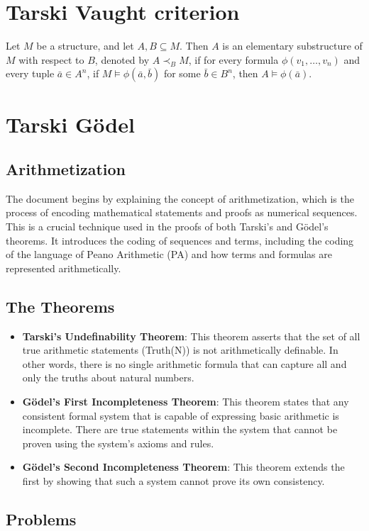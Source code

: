 \documentclass[10pt]{article}
\begin{document}
\section*{Tarski Vaught criterion}
Let $M$ be a structure, and let $A,B \subseteq M$. 
Then $A$ is an elementary substructure of $M$ with respect to $B$, denoted by $A \prec_B M$, if for every formula $\phi(v_1, \dots, v_n)$ and every tuple $\bar{a} \in A^n$, if $M \models \phi(\bar{a}, \bar{b})$ for some $\bar{b} \in B^n$, then $A \models \phi(\bar{a})$.
\section*{Tarski Gödel}
\subsection{Arithmetization}

The document begins by explaining the concept of arithmetization, which is the process of encoding mathematical statements and proofs as numerical sequences. This is a crucial technique used in the proofs of both Tarski's and Gödel's theorems. It introduces the coding of sequences and terms, including the coding of the language of Peano Arithmetic (PA) and how terms and formulas are represented arithmetically.

\subsection{The Theorems}

\begin{itemize}
    \item \textbf{Tarski's Undefinability Theorem}: This theorem asserts that the set of all true arithmetic statements (Truth(N)) is not arithmetically definable. In other words, there is no single arithmetic formula that can capture all and only the truths about natural numbers.
    \item \textbf{Gödel's First Incompleteness Theorem}: This theorem states that any consistent formal system that is capable of expressing basic arithmetic is incomplete. There are true statements within the system that cannot be proven using the system's axioms and rules.
    \item \textbf{Gödel's Second Incompleteness Theorem}: This theorem extends the first by showing that such a system cannot prove its own consistency.
\end{itemize}

\subsection{Problems}
\end{document}
